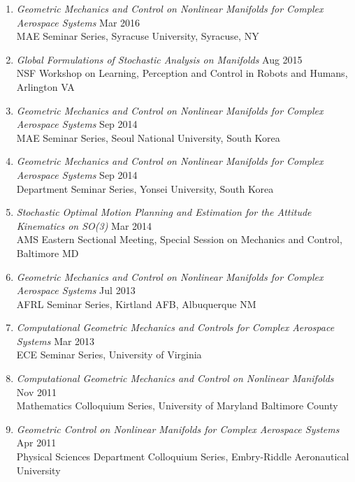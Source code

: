 \documentclass[10pt]{article}
\begin{document}
\begin{enumerate}[itemsep=2pt,parsep=2pt]
\item \textit{Geometric Mechanics and Control on Nonlinear Manifolds for Complex Aerospace Systems}  \hfill Mar 2016\\
    {MAE Seminar Series, Syracuse University}, Syracuse, NY

\item \textit{Global Formulations of Stochastic Analysis on Manifolds}  \hfill Aug 2015\\
    {NSF Workshop on Learning, Perception and Control in Robots and Humans}, Arlington VA

\item \textit{Geometric Mechanics and Control on Nonlinear Manifolds for Complex Aerospace Systems}  \hfill Sep 2014\\
    {MAE Seminar Series, Seoul National University}, South Korea

\item \textit{Geometric Mechanics and Control on Nonlinear Manifolds for Complex Aerospace Systems}  \hfill Sep 2014\\
    {Department Seminar Series, Yonsei University}, South Korea

\item \textit{Stochastic Optimal Motion Planning and Estimation for the Attitude Kinematics on SO(3)}  \hfill Mar 2014\\
    {AMS Eastern Sectional Meeting, Special Session on Mechanics and Control}, Baltimore MD

\item \textit{Geometric Mechanics and Control on Nonlinear Manifolds for Complex Aerospace Systems}  \hfill Jul 2013\\
    {AFRL Seminar Series}, Kirtland AFB, Albuquerque NM

\item \textit{Computational Geometric Mechanics and Controls for Complex Aerospace Systems}  \hfill Mar 2013\\
    {ECE Seminar Series}, University of Virginia

\item \textit{Computational Geometric Mechanics and Control on Nonlinear Manifolds}  \hfill Nov 2011\\
    {Mathematics Colloquium Series}, University of Maryland Baltimore County

\item \textit{Geometric Control on Nonlinear Manifolds for Complex Aerospace Systems}  \hfill Apr 2011\\
    {Physical Sciences Department Colloquium Series}, Embry-Riddle Aeronautical University


\end{enumerate}
\end{document}
